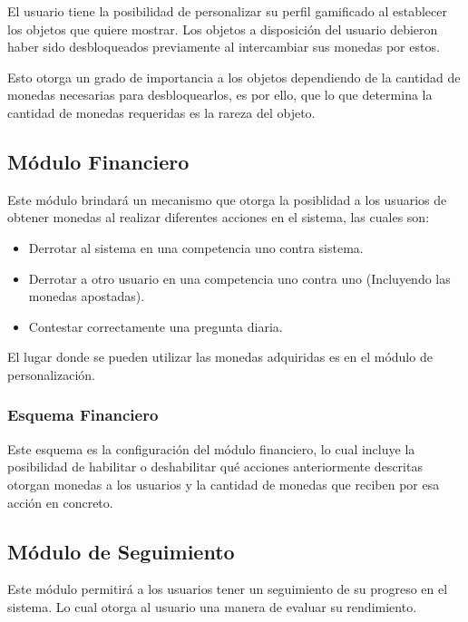   El usuario tiene la posibilidad de personalizar su perfil gamificado al establecer 
  los objetos que quiere mostrar. Los objetos a disposición del usuario debieron haber sido desbloqueados
  previamente al intercambiar sus monedas por estos. 
  
  \noindent Esto otorga un grado de importancia a los objetos dependiendo de la cantidad de monedas necesarias para desbloquearlos,
  es por ello, que lo que determina la cantidad de monedas requeridas es la rareza del objeto.

\subsection{Módulo Financiero}

Este módulo brindará un mecanismo que otorga la posiblidad a los usuarios de 
obtener monedas al realizar diferentes acciones en el sistema, las cuales son:

\begin{itemize}
  \item Derrotar al sistema en una competencia uno contra sistema.
  \item Derrotar a otro usuario en una competencia uno contra uno (Incluyendo las monedas apostadas).
  \item Contestar correctamente una pregunta diaria.
\end{itemize}

  \noindent El lugar donde se pueden utilizar las monedas adquiridas es en el módulo de personalización.

\subsubsection{Esquema Financiero}

Este esquema es la configuración del módulo financiero, lo cual incluye la posibilidad de habilitar o deshabilitar qué acciones anteriormente descritas
 otorgan monedas a los usuarios y la cantidad de monedas que reciben por esa acción en concreto.

\subsection{Módulo de Seguimiento}

Este módulo permitirá a los usuarios tener un seguimiento de su progreso en el sistema. 
Lo cual otorga al usuario una manera de evaluar su rendimiento.

